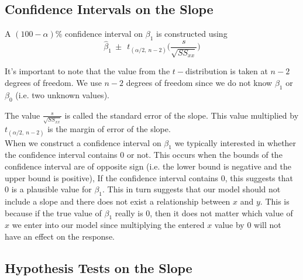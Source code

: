 \subsection{Confidence Intervals on the Slope}

\begin{ci}
\label{ciOnBeta1}
A $(100 - \alpha)$\% confidence interval on $\beta_{1}$
is constructed using
	\begin{equation}
	\hat{\beta}_{1}	~\pm ~~	t_{(\alpha / 2, ~n-2)} \bigg( \frac{s}{ \sqrt{SS_{xx} } } \bigg)
	\end{equation}
\end{ci}


\begin{nt}
It's important to note that the value from the $t-$distribution
is taken at $n-2$ degrees of freedom.
We use $n-2$ degrees of freedom since we do not know $\beta_{1}$
or $\beta_{0}$ (i.e. two unknown values).
\end{nt}
\hfill

The value $\frac{s}{ \sqrt{SS_{xx} } }$ is called the
standard error of the slope.
This value multiplied by $t_{(\alpha / 2, ~n-2)}$
is the margin of error of the slope.\\

When we construct a confidence interval on $\beta_{1}$
we typically interested in whether the confidence interval
contains 0 or not.
This occurs when the bounds of the confidence interval
are of opposite sign 
(i.e. the lower bound is negative and the upper bound is positive),
If the confidence interval contains 0, this suggests that 0 is 
a plausible value for $\beta_{1}$.
This in turn suggests that our model should not include a slope
and there does not exist a relationship between $x$ and $y$.
This is because if the true value of $\beta_{1}$ really is 0,
then it does not matter which value of $x$ we enter into our model
since multiplying the entered $x$ value by 0 will not have an effect 
on the response.



\subsection{Hypothesis Tests on the Slope}

